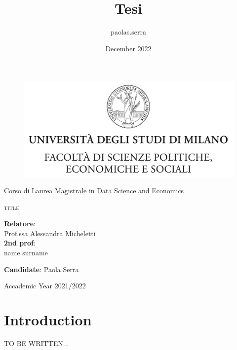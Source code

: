\documentclass{article}
\title{Tesi}
\author{paolas.serra }
\date{December 2022}
\begin{document}
\begin{titlepage}
\begin{center}
\begin{figure}[H]
\centering
\includegraphics[width=130mm]{images/tesiSCIENZE_POLITICHE.jpg}
\end{figure}    
\end{center}
\begin{center}
{\Large {Corso di Laurea Magistrale in Data Science and Economics} }
\end{center}
\vspace{0,8 cm}
\begin{center}
{\Large \textsc{title} }
\end{center}
\par
  \vspace{1 cm}
  \begin{flushleft}
  		 \textbf{Relatore}:\\ Prof.ssa Alessandra Micheletti\\
  		 \noindent \textbf{2nd prof}:\\ name surname\\
  \end{flushleft}
\par
  \vspace{0 cm}
  \begin{flushright}
  	\textbf{Candidate}: Paola Serra 
  \end{flushright}
\vspace{0,9 cm}    	  
\vfill
\begin{center}
	{\large Accademic Year 2021/2022}
\end{center}
\end{titlepage}

\break
\tableofcontents
\vspace{1.5cm}
\listoffigures
\vspace{1.5cm}
\listoftables
\break

\newpage
\section{Introduction}
TO BE WRITTEN...
\end{document}

